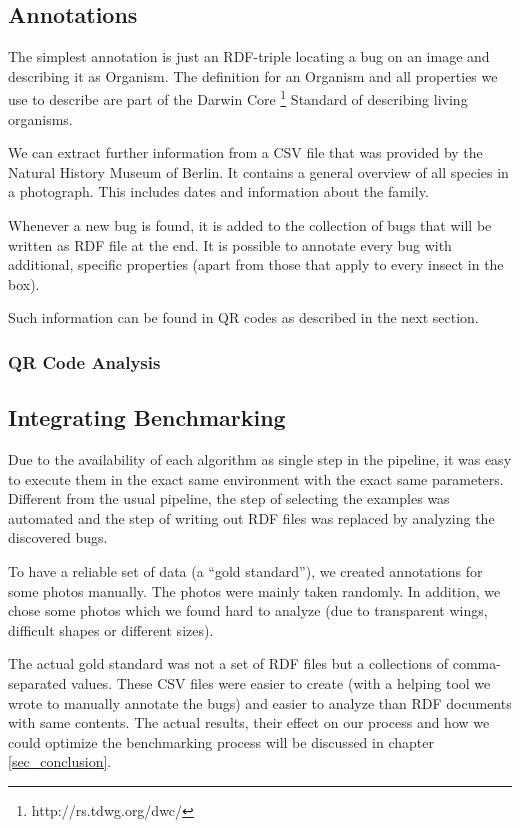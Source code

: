 \subsection{Annotations}
The simplest annotation is just an RDF-triple locating a bug on an image and describing it as Organism. 
The definition for an Organism and all properties we use to describe are part of the Darwin Core \footnote{http://rs.tdwg.org/dwc/} Standard of describing living organisms.

We can extract further information from a CSV file that was provided by the Natural History Museum of Berlin.
It contains a general overview of all species in a photograph. 
This includes dates and information about the family.

Whenever a new bug is found, it is added to the collection of bugs that will be written as RDF file at the end.
It is possible to annotate every bug with additional, specific properties (apart from those that apply to every insect in the box).

Such information can be found in QR codes as described in the next section.

\subsubsection{QR Code Analysis}

\subsection{Integrating Benchmarking}
Due to the availability of each algorithm as single step in the pipeline, it was easy to execute them in the exact same environment with the exact same parameters. 
Different from the usual pipeline, the step of selecting the examples was automated and the step of writing out RDF files was replaced by analyzing the discovered bugs.

To have a reliable set of data (a ``gold standard''), we created annotations for some photos manually. 
The photos were mainly taken randomly. 
In addition, we chose some photos which we found hard to analyze (due to transparent wings, difficult shapes or different sizes).

The actual gold standard was not a set of RDF files but a collections of comma-separated values. 
These CSV files were easier to create (with a helping tool we wrote to manually annotate the bugs) and easier to analyze than RDF documents with same contents.
The actual results, their effect on our process and how we could optimize the benchmarking process will be discussed in chapter \ref{sec_conclusion}.